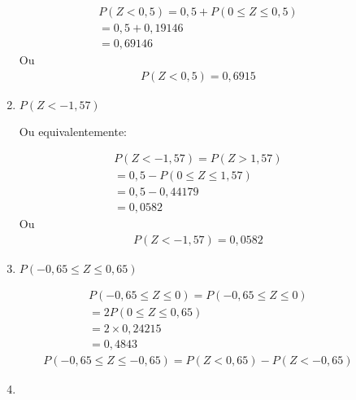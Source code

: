 \begin{description}
\begin{enumerate}[label=(\alph*)]
\begin{figure}[H]
            \centering
            
          \end{figure}

        \begin{align*}
          P(Z < 0,5)= 0,5 + P(0 \leq Z \leq 0,5) \\
          = 0,5 + 0,19146 \\
          = 0,69146
      \end{align*}
      Ou 
      \begin{align*}
        P(Z <0,5) = 0,6915
      \end{align*}

    \item $ P(Z< -1,57)$
\begin{figure}[H]
            \centering
            
          \end{figure}

Ou equivalentemente:
\begin{figure}[H]
  \centering
  
\end{figure}
      \begin{align*}
        P(Z< -1,57) = P(Z> 1,57)\\
        =0,5 - P(0 \leq Z \leq 1,57) \\
        = 0,5 - 0,44179 \\
        = 0,0582
      \end{align*}
      Ou 
      \begin{align*}
        P(Z < -1,57) = 0,0582
      \end{align*}
    \item $P(-0,65 \leq Z \leq 0,65)$
\begin{figure}[H]
            \centering
            
          \end{figure}

      \begin{align*}
        P(-0,65 \leq Z \leq 0) = P(-0,65 \leq Z \leq 0) \\
        =2 P(0 \leq Z \leq 0,65) \\
        =2 \times 0,24215 \\
        =0,4843
      \end{align*}
      \begin{align*}
        P( -0,65 \leq Z \leq -0,65 ) = P(Z < 0,65) - P(Z < -0,65)
      \end{align*}
    \item 
\begin{figure}[H]
            \centering
            
          \end{figure}


\end{enumerate}
\end{description}
